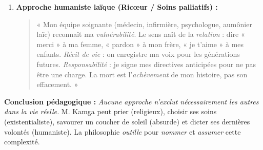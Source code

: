 \documentclass[11pt]{article}
\begin{document}
\begin{exoresolu}
\begin{enumerate}
    \item \textbf{Approche humaniste laïque (Ricœur / Soins palliatifs) :}
    \begin{quote}
    « Mon équipe soignante (médecin, infirmière, psychologue, aumônier laïc) reconnaît ma \emph{vulnérabilité}. Le sens naît de la \emph{relation} : dire « merci » à ma femme, « pardon » à mon frère, « je t'aime » à mes enfants. \emph{Récit de vie} : on enregistre ma voix pour les générations futures. \emph{Responsabilité} : je signe mes directives anticipées pour ne pas être une charge. La mort est l'\emph{achèvement} de mon histoire, pas son effacement. »
    \end{quote}
\end{enumerate}

\textbf{Conclusion pédagogique :} \emph{Aucune approche n'exclut nécessairement les autres dans la vie réelle.} M. Kamga peut prier (religieux), choisir ses soins (existentialiste), savourer un coucher de soleil (absurde) et dicter ses dernières volontés (humaniste). La philosophie \emph{outille} pour \emph{nommer} et \emph{assumer} cette complexité.
\end{exoresolu}
\end{document}
